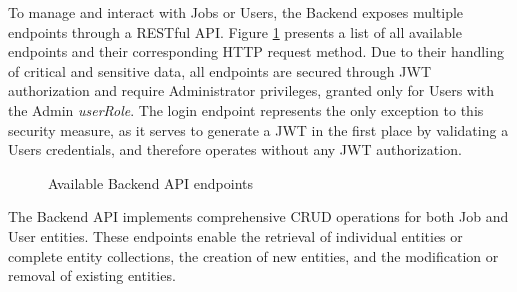 To manage and interact with Jobs or Users, the Backend exposes multiple endpoints through a \acs{REST}ful \ac{API}. Figure \ref{fig:implementation:backend} presents a list of all available endpoints and their corresponding \acs{HTTP} request method. Due to their handling of critical and sensitive data, all endpoints are secured through \ac{JWT} authorization and require Administrator privileges, granted only for Users with the Admin \emph{userRole}. The login endpoint represents the only exception to this security measure, as it serves to generate a \ac{JWT} in the first place by validating a Users credentials, and therefore operates without any \ac{JWT} authorization.
\begin{figure}[bth]
    \myfloatalign
     \quad \quad
    \caption{Available Backend \ac{API} endpoints}
    \label{fig:implementation:backend}
\end{figure}
The Backend \ac{API} implements comprehensive \ac{CRUD} operations for both Job and User entities. These endpoints enable the retrieval of individual entities or complete entity collections, the creation of new entities, and the modification or removal of existing entities.

